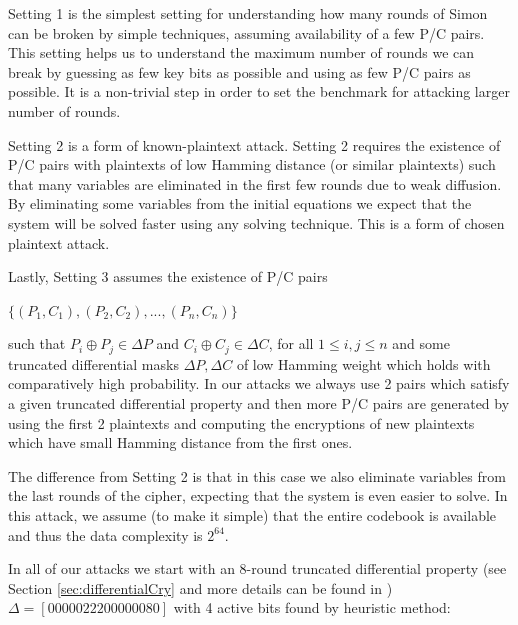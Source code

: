 
Setting 1 is the simplest setting for understanding how many rounds of Simon
can be broken by simple techniques, assuming availability of
a few P/C pairs. This setting helps us to understand the maximum number of rounds we
can break by guessing as few key bits as possible and using as few  P/C
pairs as possible. It is a non-trivial step in order to set the benchmark for attacking larger number of rounds.


Setting 2 is a form of known-plaintext attack. Setting 2 requires the existence of P/C pairs with plaintexts
of low Hamming distance (or similar plaintexts)
such that many variables are eliminated in the first few rounds due to weak
diffusion. By eliminating some variables from the initial equations we expect that
the system will be solved faster using any solving technique. This is a form of
chosen plaintext attack.

Lastly, Setting 3 assumes the existence of P/C pairs

\begin{center}
	$\{(P_1,C_1),(P_2,C_2),...,(P_n,C_n)\}$
\end{center}

such that
$P_i\oplus P_j \in \Delta P$ and $C_i\oplus C_j \in \Delta C$, for
all $1\leq i,j \leq n$ and some truncated differential masks $\Delta P,\Delta C$
of low Hamming weight which holds with comparatively high probability.
In our attacks we always use 2 pairs which satisfy a given truncated
differential property and then more P/C pairs are generated by using the
first 2 plaintexts and computing the encryptions of new plaintexts which have small Hamming distance from the
first ones. 

The difference
from Setting 2 is that in this case we also eliminate variables
from the last rounds of the cipher, expecting that the system is even easier to solve. In this
attack, we assume (to make it simple) that the entire codebook is available and thus the
data complexity is $2^{64}$.

In all of our attacks we start with an 8-round truncated differential property (see Section \ref{sec:differentialCry} and more details can be found in \cite{TheoPhD}) $\Delta=[00000222 00000080]$
with 4 active bits found by heuristic method:

